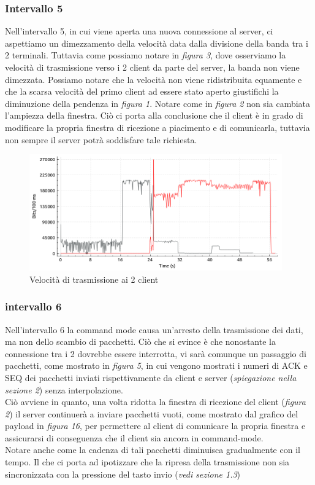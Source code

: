 \documentclass[12pt]{article}
\begin{document}
\subsubsection{Intervallo 5}
Nell’intervallo 5, in cui viene aperta una nuova connessione al server, ci aspettiamo un dimezzamento della velocità data dalla divisione della banda tra i 2 terminali. Tuttavia come possiamo notare in \textit{figura 3}, dove osserviamo la velocità di trasmissione verso i 2 client da parte del server, la banda non viene dimezzata. Possiamo notare che la velocità non viene ridistribuita equamente e che la scarsa velocità del primo client ad essere stato aperto giustifichi la diminuzione della pendenza in \textit{figura 1}.
Notare come in \textit{figura 2} non sia cambiata l'ampiezza della finestra.
Ciò ci porta alla conclusione che il client è in grado di modificare la propria finestra di ricezione a piacimento e di comunicarla, tuttavia non sempre il server potrà soddisfare tale richiesta.\\

\begin{figure}[H]
  \center	
  \includegraphics[height=5cm]{client_wireshark_speed.png}
  \caption{Velocità di trasmissione ai 2 client}
  \label{I/O}
\end{figure}

\subsubsection{intervallo 6}
Nell’intervallo 6 la command mode causa un’arresto della trasmissione dei dati, ma non dello scambio di pacchetti. Ciò che si evince è che nonostante la connessione tra i 2 dovrebbe essere interrotta, vi sarà comunque un passaggio di pacchetti, come mostrato in \textit{figura 5}, in cui vengono mostrati i numeri di ACK e SEQ dei pacchetti inviati rispettivamente da client e server (\textit{spiegazione nella sezione 2}) senza interpolazione.\\
Ciò avviene in quanto, una volta ridotta la finestra di ricezione del client (\textit{figura 2}) il server continuerà a inviare pacchetti vuoti, come mostrato dal grafico del payload in \textit{figura 16}, per permettere al client di comunicare la propria finestra e assicurarsi di conseguenza che il client sia ancora in command-mode.\\
Notare anche come la cadenza di tali pacchetti diminuisca gradualmente con il tempo. Il che ci porta ad ipotizzare che la ripresa della trasmissione non sia sincronizzata con la pressione del tasto invio (\textit{vedi sezione 1.3})
\end{document}

